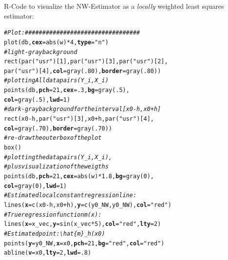\documentclass[14pt]{extreport}\usepackage[]{graphicx}\usepackage[]{xcolor}
\makeatletter
\newcommand{\hlnum}[1]{\textcolor[rgb]{0.69,0.494,0}{#1}}%
\newcommand{\hlstr}[1]{\textcolor[rgb]{0.749,0.012,0.012}{#1}}%
\newcommand{\hlcom}[1]{\textcolor[rgb]{0.514,0.506,0.514}{\textit{#1}}}%
\newcommand{\hlopt}[1]{\textcolor[rgb]{0,0,0}{#1}}%
\newcommand{\hlstd}[1]{\textcolor[rgb]{0,0,0}{#1}}%
\newcommand{\hlkwc}[1]{\textcolor[rgb]{0,0,0}{\textbf{#1}}}%
\newcommand{\hlkwd}[1]{\textcolor[rgb]{0.004,0.004,0.506}{#1}}%
\newenvironment{kframe}{%
 \def\at@end@of@kframe{}%
 \ifinner\ifhmode%
  \def\at@end@of@kframe{\end{minipage}}%
  \begin{minipage}{\columnwidth}%
 \fi\fi%
 \def\FrameCommand##1{\hskip\@totalleftmargin \hskip-\fboxsep
 \colorbox{shadecolor}{##1}\hskip-\fboxsep
     \hskip-\linewidth \hskip-\@totalleftmargin \hskip\columnwidth}%
 \MakeFramed {\advance\hsize-\width
   \@totalleftmargin\z@ \linewidth\hsize
   \@setminipage}}%
 {\par\unskip\endMakeFramed%
 \at@end@of@kframe}
\newenvironment{knitrout}{}{} %
\makeatother
\begin{document}
R-Code to visualize the NW-Estimator as a \emph{locally} weighted least squares estimator:
\begin{knitrout}
\color{fgcolor}\begin{kframe}
\begin{alltt}
\hlcom{# Plot: #################################}
\hlkwd{plot}\hlstd{(db,} \hlkwc{cex}\hlstd{=}\hlkwd{abs}\hlstd{(w)}\hlopt{*}\hlnum{4}\hlstd{,} \hlkwc{type}\hlstd{=}\hlstr{"n"}\hlstd{)}
\hlcom{# light-gray background}
\hlkwd{rect}\hlstd{(}\hlkwd{par}\hlstd{(}\hlstr{"usr"}\hlstd{)[}\hlnum{1}\hlstd{],} \hlkwd{par}\hlstd{(}\hlstr{"usr"}\hlstd{)[}\hlnum{3}\hlstd{],} \hlkwd{par}\hlstd{(}\hlstr{"usr"}\hlstd{)[}\hlnum{2}\hlstd{],}
     \hlkwd{par}\hlstd{(}\hlstr{"usr"}\hlstd{)[}\hlnum{4}\hlstd{],} \hlkwc{col} \hlstd{=} \hlkwd{gray}\hlstd{(}\hlnum{.80}\hlstd{),} \hlkwc{border}\hlstd{=}\hlkwd{gray}\hlstd{(}\hlnum{.80}\hlstd{))}
\hlcom{# plotting All data pairs (Y_i, X_i)}
\hlkwd{points}\hlstd{(db,} \hlkwc{pch}\hlstd{=}\hlnum{21}\hlstd{,} \hlkwc{cex}\hlstd{=}\hlnum{.3}\hlstd{,} \hlkwc{bg}\hlstd{=}\hlkwd{gray}\hlstd{(}\hlnum{.5}\hlstd{),}
       \hlkwc{col}\hlstd{=}\hlkwd{gray}\hlstd{(}\hlnum{.5}\hlstd{),} \hlkwc{lwd}\hlstd{=}\hlnum{1}\hlstd{)}
\hlcom{# dark-gray background for the interval [x0-h, x0+h]}
\hlkwd{rect}\hlstd{(x0}\hlopt{-}\hlstd{h,} \hlkwd{par}\hlstd{(}\hlstr{"usr"}\hlstd{)[}\hlnum{3}\hlstd{], x0}\hlopt{+}\hlstd{h,} \hlkwd{par}\hlstd{(}\hlstr{"usr"}\hlstd{)[}\hlnum{4}\hlstd{],}
     \hlkwc{col} \hlstd{=} \hlkwd{gray}\hlstd{(}\hlnum{.70}\hlstd{),} \hlkwc{border}\hlstd{=}\hlkwd{gray}\hlstd{(}\hlnum{.70}\hlstd{))}
\hlcom{# re-draw the outer box of the plot}
\hlkwd{box}\hlstd{()}
\hlcom{# plotting the data pairs (Y_i, X_i), }
\hlcom{# plus visualization of the weigths}
\hlkwd{points}\hlstd{(db,} \hlkwc{pch}\hlstd{=}\hlnum{21}\hlstd{,} \hlkwc{cex}\hlstd{=}\hlkwd{abs}\hlstd{(w)}\hlopt{*}\hlnum{1.8}\hlstd{,} \hlkwc{bg}\hlstd{=}\hlkwd{gray}\hlstd{(}\hlnum{0}\hlstd{),}
       \hlkwc{col}\hlstd{=}\hlkwd{gray}\hlstd{(}\hlnum{0}\hlstd{),} \hlkwc{lwd}\hlstd{=}\hlnum{1}\hlstd{)}
\hlcom{# Estimated local constant regression line:}
\hlkwd{lines}\hlstd{(}\hlkwc{x}\hlstd{=}\hlkwd{c}\hlstd{(x0}\hlopt{-}\hlstd{h, x0}\hlopt{+}\hlstd{h),} \hlkwc{y}\hlstd{=}\hlkwd{c}\hlstd{(y0_NW,y0_NW),} \hlkwc{col}\hlstd{=}\hlstr{"red"}\hlstd{)}
\hlcom{# True regression function m(x):}
\hlkwd{lines}\hlstd{(}\hlkwc{x}\hlstd{=x_vec,} \hlkwc{y}\hlstd{=}\hlkwd{sin}\hlstd{(x_vec} \hlopt{*} \hlnum{5}\hlstd{),} \hlkwc{col}\hlstd{=}\hlstr{"red"}\hlstd{,} \hlkwc{lty}\hlstd{=}\hlnum{2}\hlstd{)}
\hlcom{# Estimated point: \textbackslash{}hat\{m\}_h(x0)}
\hlkwd{points}\hlstd{(}\hlkwc{y} \hlstd{= y0_NW,} \hlkwc{x} \hlstd{= x0,} \hlkwc{pch}\hlstd{=}\hlnum{21}\hlstd{,} \hlkwc{bg}\hlstd{=}\hlstr{"red"}\hlstd{,} \hlkwc{col} \hlstd{=}\hlstr{"red"}\hlstd{)}
\hlkwd{abline}\hlstd{(}\hlkwc{v}\hlstd{=x0,} \hlkwc{lty}\hlstd{=}\hlnum{2}\hlstd{,} \hlkwc{lwd}\hlstd{=}\hlnum{.8}\hlstd{)}
\end{alltt}
\end{kframe}


\end{knitrout}
\end{document}
